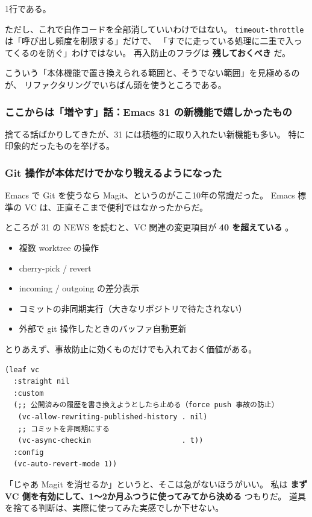 \documentclass[11pt]{article}
\begin{document}
1行である。

ただし、これで自作コードを全部消していいわけではない。
\texttt{timeout-throttle} は「呼び出し頻度を制限する」だけで、
「すでに走っている処理に二重で入ってくるのを防ぐ」わけではない。
再入防止のフラグは \textbf{残しておくべき} だ。

こういう「本体機能で置き換えられる範囲と、そうでない範囲」を見極めるのが、
リファクタリングでいちばん頭を使うところである。
\subsubsection{ここからは「増やす」話：Emacs 31 の新機能で嬉しかったもの}
\label{sec:org8d36dad}

捨てる話ばかりしてきたが、31 には積極的に取り入れたい新機能も多い。
特に印象的だったものを挙げる。
\subsubsection{Git 操作が本体だけでかなり戦えるようになった}
\label{sec:orgc577f8b}

Emacs で Git を使うなら Magit、というのがここ10年の常識だった。
Emacs 標準の VC は、正直そこまで便利ではなかったからだ。

ところが 31 の NEWS を読むと、VC 関連の変更項目が \textbf{40 を超えている} 。

\begin{itemize}
\item 複数 worktree の操作
\item cherry-pick / revert
\item incoming / outgoing の差分表示
\item コミットの非同期実行（大きなリポジトリで待たされない）
\item 外部で git 操作したときのバッファ自動更新
\end{itemize}

とりあえず、事故防止に効くものだけでも入れておく価値がある。

\begin{verbatim}
(leaf vc
  :straight nil
  :custom
  (;; 公開済みの履歴を書き換えようとしたら止める（force push 事故の防止）
   (vc-allow-rewriting-published-history . nil)
   ;; コミットを非同期にする
   (vc-async-checkin                     . t))
  :config
  (vc-auto-revert-mode 1))
\end{verbatim}

「じゃあ Magit を消せるか」というと、そこは急がないほうがいい。
私は \textbf{まず VC 側を有効にして、1〜2か月ふつうに使ってみてから決める} つもりだ。
道具を捨てる判断は、実際に使ってみた実感でしか下せない。
\end{document}
